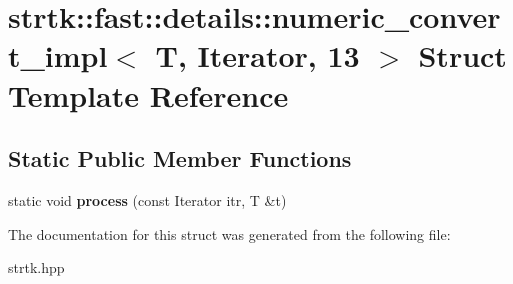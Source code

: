 \hypertarget{structstrtk_1_1fast_1_1details_1_1numeric__convert__impl_3_01T_00_01Iterator_00_0113_01_4}{\section{strtk\-:\-:fast\-:\-:details\-:\-:numeric\-\_\-convert\-\_\-impl$<$ T, Iterator, 13 $>$ Struct Template Reference}
\label{structstrtk_1_1fast_1_1details_1_1numeric__convert__impl_3_01T_00_01Iterator_00_0113_01_4}
}
\subsection*{Static Public Member Functions}
\begin{DoxyCompactItemize}
\item 
\hypertarget{structstrtk_1_1fast_1_1details_1_1numeric__convert__impl_3_01T_00_01Iterator_00_0113_01_4_a525fc208e72e6c31d974222201e9ad0b}{static void {\bfseries process} (const Iterator itr, T \&t)}\label{structstrtk_1_1fast_1_1details_1_1numeric__convert__impl_3_01T_00_01Iterator_00_0113_01_4_a525fc208e72e6c31d974222201e9ad0b}

\end{DoxyCompactItemize}


The documentation for this struct was generated from the following file\-:\begin{DoxyCompactItemize}
\item 
strtk.\-hpp\end{DoxyCompactItemize}
